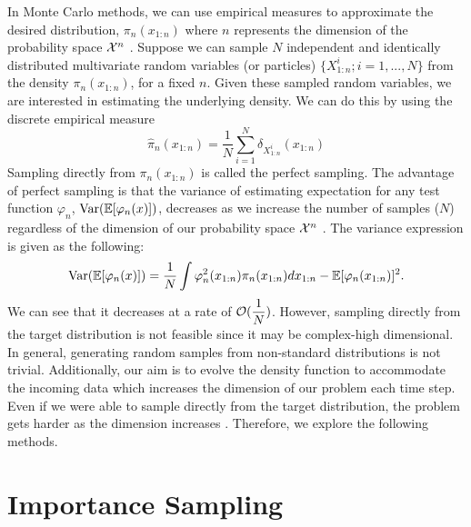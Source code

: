 \documentclass[10pt]{article}
\theoremstyle{definition}
\numberwithin{equation}{section}
\begin{document}
In Monte Carlo methods, we can use empirical measures to approximate the desired distribution, $\pi_n(x_{1:n})$ where $n$ represents the dimension of the probability space $\mathcal{X}^n$ \cite{doucet2008}. Suppose we can sample $N$ independent and identically distributed multivariate random variables (or particles) $\{ X^{i}_{1:n}; i = 1, ..., N\}$ from the density $\pi_n(x_{1:n})$, for a fixed $n$. Given these sampled random variables, we are interested in estimating the underlying density. We can do this by using the discrete empirical measure 
\begin{equation}
	\hat{\pi}_n (x_{1:n}) = \frac{1}{N}\sum_{i=1}^{N}\delta_{X^{i}_{1:n}}(x_{1:n})
\end{equation}
Sampling directly from  $\pi_n(x_{1:n})$ is called the perfect sampling. The advantage of perfect sampling is that the variance of estimating expectation for any test function $\varphi_n$, $\text{Var}(\mathbb{E}[\varphi_n(x)])$, decreases as we increase the number of samples ($N$) regardless of the dimension of our probability space $\mathcal{X}^n$ \cite{doucet2008}.  The variance expression is given as the following:
\begin{equation}
	\text{Var}(\mathbb{E}[\varphi_n(x)]) = \dfrac{1}{N} \int \varphi_n^2(x_{1:n}) \pi_n(x_{1:n})dx_{1:n} - \mathbb{E}[\varphi_n(x_{1:n})]^2.
\end{equation}
We can see that it decreases at a rate of $\mathcal{O}(\dfrac{1}{N})$. However, sampling directly from the target distribution is not feasible since it may be complex-high dimensional. In general, generating random samples from non-standard distributions is not trivial. Additionally, our aim is to evolve the density function to accommodate the incoming data which increases the dimension of our problem each time step. Even if we were able to sample directly from the target distribution, the problem gets harder as the dimension increases \cite{doucet2008}. Therefore, we explore the following methods.

\section{Importance Sampling}
\end{document}
